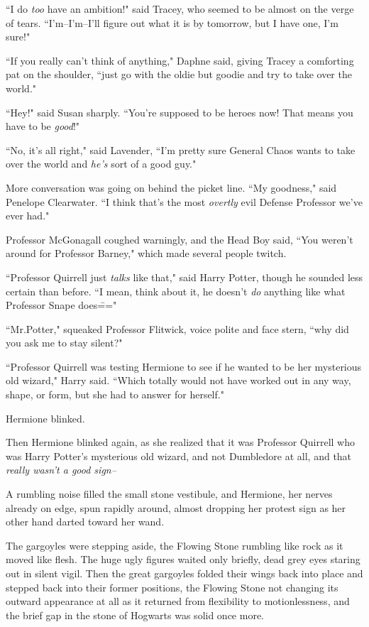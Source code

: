 ``I do \emph{too} have an ambition!" said Tracey, who seemed to be almost on the verge of tears. ``I'm\---I'm\---I'll figure out what it is by tomorrow, but I have one, I'm sure!"

``If you really can't think of anything," Daphne said, giving Tracey a comforting pat on the shoulder, ``just go with the oldie but goodie and try to take over the world."

``Hey!" said Susan sharply. ``You're supposed to be heroes now! That means you have to be \emph{good}!"

``No, it's all right," said Lavender, ``I'm pretty sure General Chaos wants to take over the world and \emph{he's} sort of a good guy."

More conversation was going on behind the picket line. ``My goodness," said Penelope Clearwater. ``I think that's the most \emph{overtly} evil Defense Professor we've ever had."

Professor McGonagall coughed warningly, and the Head Boy said, ``You weren't around for Professor Barney," which made several people twitch.

``Professor Quirrell just \emph{talks} like that," said Harry Potter, though he sounded less certain than before. ``I mean, think about it, he doesn't \emph{do} anything like what Professor Snape does\==="

``Mr.\?Potter," squeaked Professor Flitwick, voice polite and face stern, ``why did you ask me to stay silent?"

``Professor Quirrell was testing Hermione to see if he wanted to be her mysterious old wizard," Harry said. ``Which totally would not have worked out in any way, shape, or form, but she had to answer for herself."

Hermione blinked.

Then Hermione blinked again, as she realized that it was Professor Quirrell who was Harry Potter's mysterious old wizard, and not Dumbledore at all, and that \emph{really wasn't a good sign\---}

A rumbling noise filled the small stone vestibule, and Hermione, her nerves already on edge, spun rapidly around, almost dropping her protest sign as her other hand darted toward her wand.

The gargoyles were stepping aside, the Flowing Stone rumbling like rock as it moved like flesh. The huge ugly figures waited only briefly, dead grey eyes staring out in silent vigil. Then the great gargoyles folded their wings back into place and stepped back into their former positions, the Flowing Stone not changing its outward appearance at all as it returned from flexibility to motionlessness, and the brief gap in the stone of Hogwarts was solid once more.

